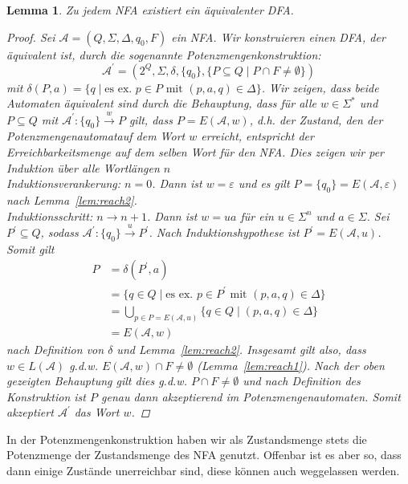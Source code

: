 \documentclass[11pt, a4paper]{article}
\theoremstyle{definition}
\theoremstyle{plain}
\newtheorem{lemma}[definition]{Lemma}
\numberwithin{equation}{section}
\newcommand{\reaches}[1]{\overset{#1}{\rightarrow}}
\begin{document}
\begin{lemma}\label{lem:nfa2dfa}
	Zu jedem NFA existiert ein äquivalenter DFA.
	\begin{proof}
		Sei \( \mathcal{A} = (Q, \Sigma, \Delta, q_0, F) \) ein NFA. Wir konstruieren einen DFA, der äquivalent ist, durch die sogenannte \textit{Potenzmengenkonstruktion}:
		\[
			\mathcal{A}^\prime = (2^Q, \Sigma, \delta, \{q_0\}, \{ P \subseteq Q \mid P \cap F \neq \emptyset \})
		\]
		mit \( \delta(P, a) = \{ q \mid \text{es ex. } p \in P \text{ mit } (p, a, q) \in \Delta \} \).
		Wir zeigen, dass beide Automaten äquivalent sind durch die Behauptung, dass für alle \( w \in \Sigma^\ast \) und \( P \subseteq Q \) mit \( \mathcal{A}^\prime: \{q_0\} \reaches{w} P \) gilt, dass \( P = E(\mathcal{A}, w) \), d.h. der Zustand, den der Potenzmengenautomatauf dem Wort \( w \) erreicht, entspricht der Erreichbarkeitsmenge auf dem selben Wort für den NFA. Dies zeigen wir per Induktion über alle Wortlängen \( n \)\\
		Induktionsverankerung: \( n = 0 \). Dann ist \( w = \varepsilon \) und es gilt \( P = \{q_0\} = E(\mathcal{A}, \varepsilon) \) nach Lemma~\ref{lem:reach2}.\\
		Induktionsschritt: \( n \rightarrow {n+1} \). Dann ist \( w = ua \) für ein \( u \in \Sigma^n \) und \( a \in \Sigma \). Sei \( P^\prime \subseteq Q \), sodass \( \mathcal{A}^\prime: \{q_0\} \reaches{u} P^\prime \). Nach Induktionshypothese ist \( P^\prime = E(\mathcal{A}, u) \). Somit gilt
		\begin{align*}
			P &= \delta(P^\prime, a)\\
			&= \{q \in Q \mid \text{es ex. } p \in P^\prime \text{ mit } (p, a, q) \in \Delta\}\\
			&= \bigcup_{p \in P = E(\mathcal{A}, u)} \{q \in Q \mid (p, a, q) \in \Delta\}\\
			&= E(\mathcal{A}, w)
		\end{align*}
		nach Definition von \( \delta \) und Lemma~\ref{lem:reach2}. Insgesamt gilt also, dass \( w \in L(\mathcal{A}) \) {g.d.w.} \( E(\mathcal{A}, w) \cap F \neq \emptyset \) (Lemma~\ref{lem:reach1}). Nach der oben gezeigten Behauptung gilt dies {g.d.w.} \( P \cap F \neq \emptyset \) und nach Definition des Konstruktion ist \( P \) genau dann akzeptierend im Potenzmengenautomaten. Somit akzeptiert \( \mathcal{A}^\prime \) das Wort \( w \).
	\end{proof}
\end{lemma}
In der Potenzmengenkonstruktion haben wir als Zustandsmenge stets die Potenzmenge der Zustandsmenge des NFA genutzt. Offenbar ist es aber so, dass dann einige Zustände unerreichbar sind, diese können auch weggelassen werden.
\end{document}
